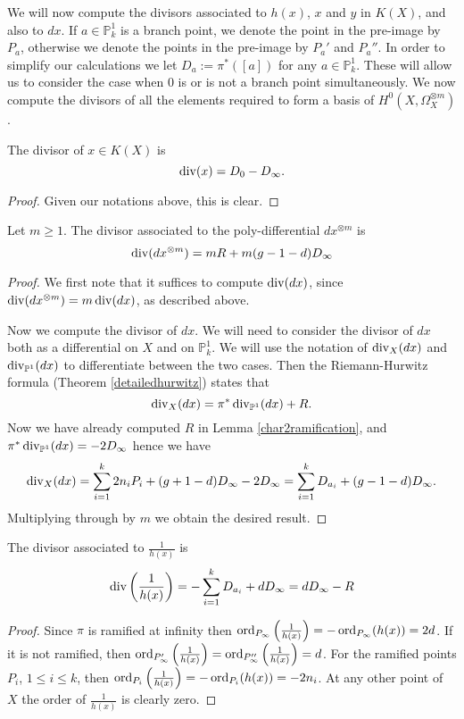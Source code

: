 We will now compute the divisors associated to $h(x)$, $x$ and $y$ in $K(X)$, and also to $dx$.
If $a\in \mathbb P_k^1$ is a branch point, we denote the point in the pre-image by $P_a$, otherwise we denote the points in the pre-image by $P_a'$ and $P_a''$.
In order to simplify our calculations we let $D_a := \pi^*([a])$ for any $a\in \mathbb P_k^1$.
These will allow us to consider the case when 0 is or is not a branch point simultaneously. 
We now compute the divisors of all the elements required to form a basis of $H^0(X,\Omega_X^{\otimes m})$.

\begin{lem}\label{xchar2}
The divisor of $x\in K(X)$ is 
\[
\operatorname{div} (x)= D_0 - D_\infty.
\]
\end{lem}
\begin{proof}
Given our notations above, this is clear.
\end{proof}


\begin{lem}\label{dxchar2}
Let $m\geq 1$.
The divisor associated to the poly-differential $dx^{\otimes m}$ is 
\[
\operatorname{div} (dx^{\otimes m}) =mR + m(g-1-d)D_\infty
\]
\end{lem}
\begin{proof}
We first note that it suffices to compute $\operatorname{div} (dx)$, since $\operatorname{div} (dx^{\otimes m}) = m\operatorname{div} (dx)$, as described above.

Now we compute the divisor of $dx$.
We will need to consider the divisor of $dx$ both as a differential on $X$ and on $\mathbb P_k^1$. 
We will use the notation of $\operatorname{div}_X(dx)$ and $\operatorname{div}_{\mathbb P^1}(dx)$ to differentiate between the two cases.
Then the Riemann-Hurwitz formula (Theorem \ref{detailedhurwitz}) states that
\[
\operatorname{div}_X( dx) = \pi^*\operatorname{div}_{\mathbb P^1}(dx) + R.
\]
Now we have already computed $R$ in Lemma \ref{char2ramification}, and $\pi^*\operatorname{div}_{\mathbb P^1}(dx) = -2D_\infty$ hence we have
\[
\operatorname{div}_X( dx) = \sum_{i=1}^k 2n_iP_i + (g+1-d)D_\infty - 2D_\infty = \sum_{i=1}^k D_{a_i} + (g-1-d)D_\infty.
\]
Multiplying through by $m$ we obtain the desired result.
\end{proof}



\begin{lem}\label{h(x)char2}
The divisor associated to $\frac{1}{h(x)}$ is
\[
\operatorname{div} \left(\frac{1}{h(x)}\right) = - \sum_{i=1}^k D_{a_i} + dD_\infty = dD_\infty - R
\]
\end{lem}
\begin{proof}
Since $\pi$ is ramified at infinity then $\operatorname{ord}_{P_{\infty}}\left(\frac{1}{h(x)}\right) = -\operatorname{ord}_{P_{\infty}}(h(x)) = 2d$.
If it is not ramified, then $\operatorname{ord}_{P_{\infty}'}\left(\frac{1}{h(x)}\right) = \operatorname{ord}_{P_{\infty}''}\left(\frac{1}{h(x)}\right)=d$.
For the ramified points $P_i$, $1\leq i \leq k$, then $\operatorname{ord}_{P_i}\left(\frac{1}{h(x)}\right) = -\operatorname{ord}_{P_i}(h(x))= -2n_i$.
At any other point of $X$ the order of $\frac{1}{h(x)}$ is clearly zero.
\end{proof}

